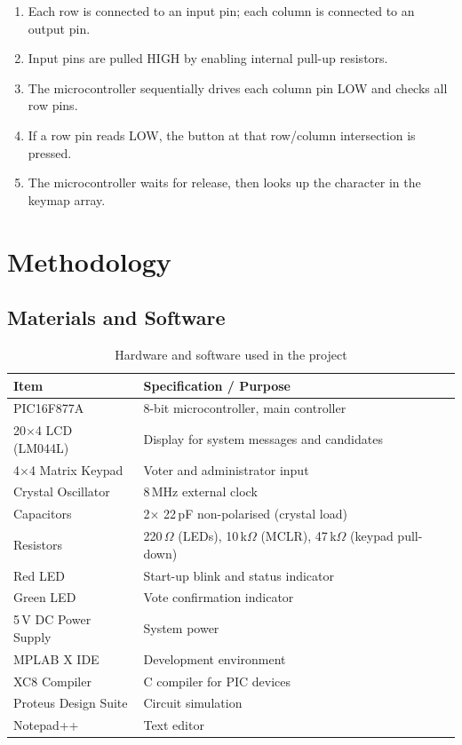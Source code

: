 \documentclass[11pt, a4paper]{report}
\begin{document}
\begin{enumerate}
    \item Each row is connected to an input pin; each column is connected to
          an output pin.
    \item Input pins are pulled HIGH by enabling internal pull-up resistors.
    \item The microcontroller sequentially drives each column pin LOW and
          checks all row pins.
    \item If a row pin reads LOW, the button at that row/column intersection
          is pressed.
    \item The microcontroller waits for release, then looks up the character
          in the keymap array.
\end{enumerate}

\chapter{Methodology}

\section{Materials and Software}

\begin{table}[H]
\centering
\caption{Hardware and software used in the project}
\label{tab:materials}
\begin{tabular}{ll}
\toprule
\textbf{Item} & \textbf{Specification / Purpose} \\
\midrule
PIC16F877A & 8-bit microcontroller, main controller \\
20$\times$4 LCD (LM044L) & Display for system messages and candidates \\
4$\times$4 Matrix Keypad & Voter and administrator input \\
Crystal Oscillator & 8\,MHz external clock \\
Capacitors & 2$\times$ 22\,pF non-polarised (crystal load) \\
Resistors & 220\,$\Omega$ (LEDs), 10\,k$\Omega$ (MCLR), 47\,k$\Omega$
            (keypad pull-down) \\
Red LED & Start-up blink and status indicator \\
Green LED & Vote confirmation indicator \\
5\,V DC Power Supply & System power \\
\midrule
MPLAB X IDE & Development environment \\
XC8 Compiler & C compiler for PIC devices \\
Proteus Design Suite & Circuit simulation \\
Notepad++ & Text editor \\
\bottomrule
\end{tabular}
\end{table}
\end{document}
